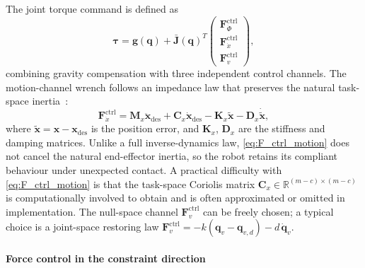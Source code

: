 \documentclass[
	german,%
	accentcolor=9c,%
	ruledheaders=section,%
	class=report,%
	thesis={type=bachelor},%
	fontsize=11pt,%
	parskip=half-,%
	custommargins=true,%
	marginpar=false,%
]{tudapub}
\begin{document}
The joint torque command is defined as~\cite[Eq.~15]{iskandar2023}
\begin{equation}
    \boldsymbol{\tau}
    = \mathbf{g}(\mathbf{q})
      + \bar{\mathbf{J}}(\mathbf{q})^{T}
        \begin{pmatrix}
            \mathbf{F}^{\text{ctrl}}_{\dot{\Phi}} \\
            \mathbf{F}^{\text{ctrl}}_{\dot{x}} \\
            \mathbf{F}^{\text{ctrl}}_{v}
        \end{pmatrix},
    \label{eq:tau_hfi}
\end{equation}
combining gravity compensation with three independent control channels.
The motion-channel wrench follows an impedance law that preserves the
natural task-space inertia~\cite[Eq.~16]{iskandar2023}:
\begin{equation}
    \mathbf{F}^{\text{ctrl}}_{\dot{x}}
    = \mathbf{M}_{x}\ddot{\mathbf{x}}_{\text{des}}
      + \mathbf{C}_{x}\dot{\mathbf{x}}_{\text{des}}
      - \mathbf{K}_{x}\tilde{\mathbf{x}}
      - \mathbf{D}_{x}\dot{\tilde{\mathbf{x}}},
    \label{eq:F_ctrl_motion}
\end{equation}
where $\tilde{\mathbf{x}} = \mathbf{x} - \mathbf{x}_{\text{des}}$ is the
position error, and $\mathbf{K}_{x}$, $\mathbf{D}_{x}$ are the stiffness
and damping matrices.
Unlike a full inverse-dynamics law, \eqref{eq:F_ctrl_motion} does not cancel
the natural end-effector inertia, so the robot retains its compliant behaviour
under unexpected contact.
A practical difficulty with \eqref{eq:F_ctrl_motion} is that the task-space
Coriolis matrix $\mathbf{C}_{x} \in \mathbb{R}^{(m-c)\times(m-c)}$ is
computationally involved to obtain and is often approximated or omitted in
implementation.
The null-space channel $\mathbf{F}^{\text{ctrl}}_{v}$ can be freely chosen;
a typical choice is a joint-space restoring law
$\mathbf{F}^{\text{ctrl}}_{v} = -k(\mathbf{q}_{v} - \mathbf{q}_{v,d})
- d\,\dot{\mathbf{q}}_{v}$.

\paragraph{Force control in the constraint direction}
\end{document}
